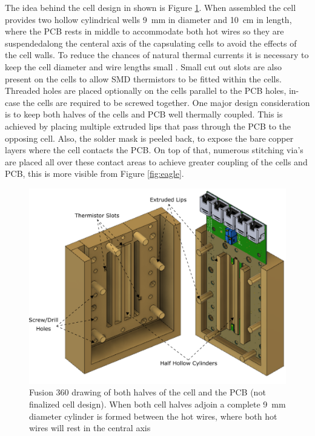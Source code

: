 \documentclass[12pt,MEng]{UoAThesis}
\begin{document}
The idea behind the cell design in shown is Figure \ref{fig:cell}. When assembled the cell provides two hollow cylindrical wells \SI{9}{\milli\meter} in diameter and \SI{10}{\centi\meter} in length, where the PCB rests in middle to accommodate both hot wires so they are suspendedalong the centeral axis of the capsulating cells to avoid the effects of the cell walls. To reduce the chances of natural thermal currents it is necessary to keep the cell diameter and wire lengths small \cite{groot}. Small cut out slots are also present on the cells to allow SMD thermistors to be fitted within the cells. Threaded holes are placed optionally on the cells parallel to the PCB holes, in-case the cells are required to be screwed together. One major design consideration is to keep both halves of the cells and PCB well thermally coupled. This is achieved by placing multiple extruded lips that pass through the PCB to the opposing cell. Also, the solder mask is peeled back, to expose the bare copper layers where the cell contacts the PCB. On top of that, numerous stitching via's are placed all over these contact areas to achieve greater coupling of the cells and PCB, this is more visible from Figure \ref{fig:eagle}. 

\begin{figure}[htp]
  \centering
  \includegraphics[clip,width=1\linewidth]{figures/cell}
  \caption{\label{fig:cell} Fusion 360 drawing of both halves of the cell and the PCB (not finalized cell design). When both cell halves adjoin a complete \SI{9}{\milli\meter} diameter cylinder is formed between the hot wires, where both hot wires will rest in the central axis}
\end{figure}
\end{document}
